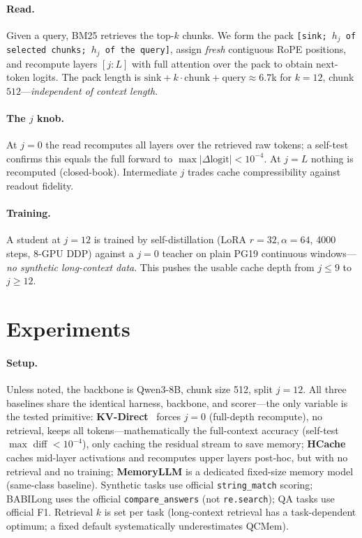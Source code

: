 \documentclass[11pt]{article}
\begin{document}
\paragraph{Read.} Given a query, BM25 retrieves the top-$k$ chunks. We form the
pack \texttt{[sink; $h_j$ of selected chunks; $h_j$ of the query]}, assign
\emph{fresh} contiguous RoPE positions, and recompute layers $[j{:}L]$ with
full attention over the pack to obtain next-token logits. The pack length is
$\text{sink}+k\cdot\text{chunk}+\text{query}\approx6.7$k for $k{=}12$,
chunk $512$---\emph{independent of context length}.

\paragraph{The $j$ knob.} At $j{=}0$ the read recomputes all layers over the
retrieved raw tokens; a self-test confirms this equals the full forward to
$\max|\Delta\text{logit}|<10^{-4}$. At $j{=}L$ nothing is recomputed
(closed-book). Intermediate $j$ trades cache compressibility against readout
fidelity.

\paragraph{Training.} A student at $j{=}12$ is trained by self-distillation
(LoRA $r{=}32,\alpha{=}64$, 4000 steps, 8-GPU DDP) against a $j{=}0$ teacher on
plain PG19 continuous windows---\emph{no synthetic long-context data}. This
pushes the usable cache depth from $j{\le}9$ to $j{\ge}12$.

\section{Experiments}
\label{sec:results}
\paragraph{Setup.} Unless noted, the backbone is Qwen3-8B, chunk size 512,
split $j{=}12$. All three baselines share the identical harness, backbone, and
scorer---the only variable is the tested primitive:
\textbf{KV-Direct}~\citep{residualstream} forces $j{=}0$ (full-depth
recompute), no retrieval, keeps all tokens---mathematically the full-context
accuracy (self-test $\max$ diff $<10^{-4}$), only caching the residual stream
to save memory; \textbf{HCache}~\citep{hcache} caches mid-layer activations and
recomputes upper layers post-hoc, but with no retrieval and no training;
\textbf{MemoryLLM} is a dedicated fixed-size memory model (same-class baseline).
Synthetic tasks use official \texttt{string\_match} scoring; BABILong uses the
official \texttt{compare\_answers} (not \texttt{re.search}); QA tasks use
official F1. Retrieval $k$ is set per task (long-context retrieval has a
task-dependent optimum; a fixed default systematically underestimates QCMem).
\end{document}
